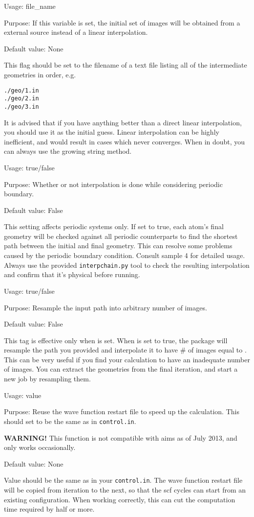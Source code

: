 {
Usage:  file\_name


Purpose: If this variable is set, the initial set of images will be obtained from a external source instead of a linear interpolation.

Default value: None
}
 This flag should be set to the filename of a text file listing all of the intermediate geometries in order, e.g.
\begin{verbatim}
./geo/1.in
./geo/2.in
./geo/3.in
\end{verbatim}
It is advised that if you have anything better than a direct linear interpolation, you should use it as the initial guess. Linear interpolation can be highly inefficient, and would result in cases which never converges. When in doubt, you can always use the growing string method. 

{
Usage:  true/false


Purpose: Whether or not interpolation is done while considering periodic boundary.

Default value: False
}
This setting affects periodic systems only. If set to true, each atom's final geometry will be checked against all periodic counterparts to find the shortest path between the initial and final geometry. This can resolve some problems caused by the periodic boundary condition. Consult sample 4 for detailed usage. Always use the provided \texttt{interpchain.py} tool to check the resulting interpolation and confirm that it's physical before running. 

{
Usage:  true/false 


Purpose: Resample the input path into arbitrary number of images. 

Default value: False
}
This tag is effective only when  is set. When  is set to true, the package will resample the path you provided and interpolate it to have \# of images equal to . This can be very useful if you find your calculation to have an inadequate number of images. You can extract the geometries from the final iteration, and start a new job by resampling them. 

{
Usage:  value 


Purpose: Reuse the wave function restart file to speed up the calculation. This should set to be the same as  in \texttt{control.in}.

\textbf{WARNING!} This function is not compatible with aims as of July 2013, and only works occasionally.  


Default value: None
}
Value should be the same as  in your \texttt{control.in}. The wave function restart file will be copied from iteration to the next, so that the scf cycles can start from an existing configuration. When working correctly, this can cut the computation time required by half or more. 

